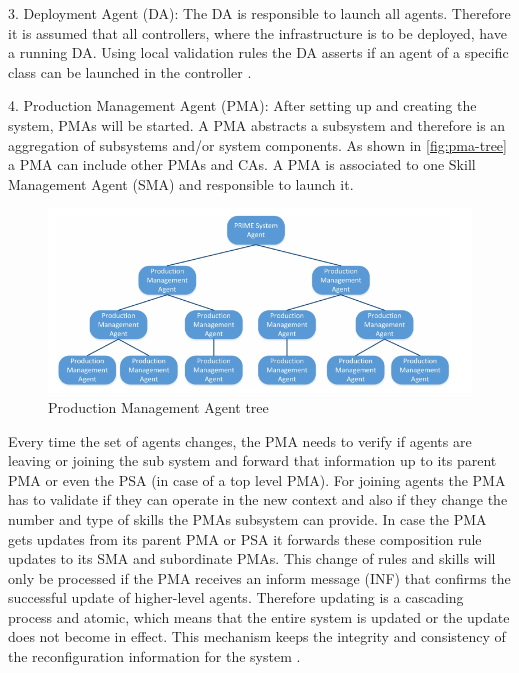 \documentclass[conference,compsoc,hidelinks]{IEEEtran}
\begin{document}
3. Deployment Agent (DA): The DA is responsible to launch all agents. Therefore it is assumed that all controllers, where the infrastructure is to be deployed, have a running DA. Using local validation rules the DA asserts if an agent of a specific class can be launched in the controller \cite{Hybrid}. 

4. Production Management Agent (PMA): After setting up and creating the system, PMAs will be started. A PMA abstracts a subsystem and therefore is an aggregation of subsystems and/or system components. As shown in \autoref{fig:pma-tree} a PMA can include other PMAs and CAs. A PMA is associated to one Skill Management Agent (SMA) and responsible to launch it. 

\begin{figure}[ht]
	\includegraphics[width=\columnwidth]{img/Production-Management-Agent-Tree.png}
	\caption{Production Management Agent tree \cite{Hybrid}}
	\label{fig:pma-tree}
\end{figure}

Every time the set of agents changes, the PMA needs to verify if agents are leaving or joining the sub system and forward that information up to its parent PMA or even the PSA (in case of a top level PMA). For joining agents the PMA has to validate if they can operate in the new context and also if they change the number and type of skills the PMAs subsystem can provide. In case the PMA gets updates from its parent PMA or PSA it forwards these composition rule updates to its SMA and subordinate PMAs. This change of rules and skills will only be processed if the PMA receives an inform message (INF) that confirms the successful update of higher-level agents. Therefore updating is a cascading process and atomic, which means that the entire system is updated or the update does not become in effect. This mechanism keeps the integrity and consistency of the reconfiguration information for the system \cite{Hybrid}.
\end{document}
